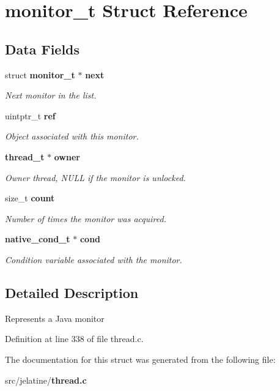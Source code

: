 \section{monitor\_\-t Struct Reference}
\label{structmonitor__t}
\subsection*{Data Fields}
\begin{DoxyCompactItemize}
\item 
struct {\bf monitor\_\-t} $\ast$ {\bf next}\label{structmonitor__t_a2b9d19abbcae80bfe2fddbd936a1380a}

\begin{DoxyCompactList}\small\item\em Next monitor in the list. \item\end{DoxyCompactList}\item 
uintptr\_\-t {\bf ref}\label{structmonitor__t_ac81af8d01fdb8bb48b8ba7901d997347}

\begin{DoxyCompactList}\small\item\em Object associated with this monitor. \item\end{DoxyCompactList}\item 
{\bf thread\_\-t} $\ast$ {\bf owner}\label{structmonitor__t_aec28adc3a660b72c8dbfbe5c9044d0cf}

\begin{DoxyCompactList}\small\item\em Owner thread, NULL if the monitor is unlocked. \item\end{DoxyCompactList}\item 
size\_\-t {\bf count}\label{structmonitor__t_af971ff0283195e45d60e657ac52b446e}

\begin{DoxyCompactList}\small\item\em Number of times the monitor was acquired. \item\end{DoxyCompactList}\item 
{\bf native\_\-cond\_\-t} $\ast$ {\bf cond}\label{structmonitor__t_ab405e53ba3c808e4726047384fcb8831}

\begin{DoxyCompactList}\small\item\em Condition variable associated with the monitor. \item\end{DoxyCompactList}\end{DoxyCompactItemize}


\subsection{Detailed Description}
Represents a Java monitor 

Definition at line 338 of file thread.c.



The documentation for this struct was generated from the following file:\begin{DoxyCompactItemize}
\item 
src/jelatine/{\bf thread.c}\end{DoxyCompactItemize}
